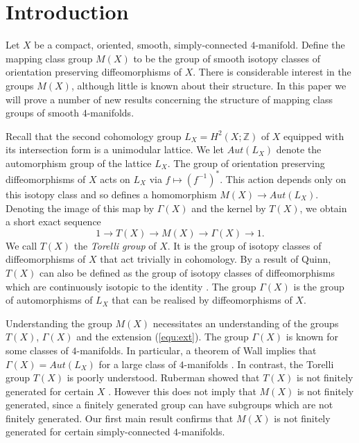 \documentclass{amsart}
\theoremstyle{definition}
\theoremstyle{remark}
\numberwithin{equation}{section}
\begin{document}
\maketitle




\section{Introduction}

Let $X$ be a compact, oriented, smooth, simply-connected $4$-manifold. Define the mapping class group $M(X)$ to be the group of smooth isotopy classes of orientation preserving diffeomorphisms of $X$. There is considerable interest in the groups $M(X)$, although little is known about their structure. In this paper we will prove a number of new results concerning the structure of mapping class groups of smooth $4$-manifolds.

Recall that the second cohomology group $L_X = H^2(X ; \mathbb{Z})$ of $X$ equipped with its intersection form is a unimodular lattice. We let $Aut(L_X)$ denote the automorphism group of the lattice $L_X$. The group of orientation preserving diffeomorphisms of $X$ acts on $L_X$ via $f \mapsto (f^{-1})^*$. This action depends only on this isotopy class and so defines a homomorphism $M(X) \to Aut(L_X)$. Denoting the image of this map by $\Gamma(X)$ and the kernel by $T(X)$, we obtain a short exact sequence
\begin{equation}\label{equ:ext}
1 \to T(X) \to M(X) \to \Gamma(X) \to 1.
\end{equation}
We call $T(X)$ the {\em Torelli group} of $X$. It is the group of isotopy classes of diffeomorphisms of $X$ that act trivially in cohomology. By a result of Quinn, $T(X)$ can also be defined as the group of isotopy classes of diffeomorphisms which are continuously isotopic to the identity \cite{qui}. The group $\Gamma(X)$ is the group of automorphisms of $L_X$ that can be realised by diffeomorphisms of $X$.

Understanding the group $M(X)$ necessitates an understanding of the groups $T(X)$, $\Gamma(X)$ and the extension (\ref{equ:ext}). The group $\Gamma(X)$ is known for some classes of $4$-manifolds. In particular, a theorem of Wall implies that $\Gamma(X) = Aut(L_X)$ for a large class of $4$-manifolds \cite{wall}. In contrast, the Torelli group $T(X)$ is poorly understood. Ruberman showed that $T(X)$ is not finitely generated for certain $X$ \cite{rub3}. However this does not imply that $M(X)$ is not finitely generated, since a finitely generated group can have subgroups which are not finitely generated. Our first main result confirms that $M(X)$ is not finitely generated for certain simply-connected $4$-manifolds.
\end{document}
